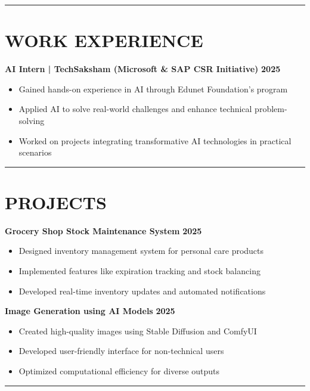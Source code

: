 \documentclass[11pt, a4paper]{article}
\begin{document}
\noindent\rule{\textwidth}{0.4pt}

{\centering\section*{WORK EXPERIENCE}\par}
\textbf{AI Intern | TechSaksham (Microsoft \& SAP CSR Initiative)} \hfill \textbf{2025}
\begin{itemize}[noitemsep,topsep=0pt]
    \item Gained hands-on experience in AI through Edunet Foundation's program
    \item Applied AI to solve real-world challenges and enhance technical problem-solving
    \item Worked on projects integrating transformative AI technologies in practical scenarios
\end{itemize}

\noindent\rule{\textwidth}{0.4pt}

{\centering\section*{PROJECTS}\par}
\textbf{Grocery Shop Stock Maintenance System} \hfill \textbf{2025}
\begin{itemize}[noitemsep,topsep=0pt]
    \item Designed inventory management system for personal care products
    \item Implemented features like expiration tracking and stock balancing
    \item Developed real-time inventory updates and automated notifications
\end{itemize}

\textbf{Image Generation using AI Models} \hfill \textbf{2025}
\begin{itemize}[noitemsep,topsep=0pt]
    \item Created high-quality images using Stable Diffusion and ComfyUI
    \item Developed user-friendly interface for non-technical users
    \item Optimized computational efficiency for diverse outputs
\end{itemize}

\noindent\rule{\textwidth}{0.4pt}
\end{document}
